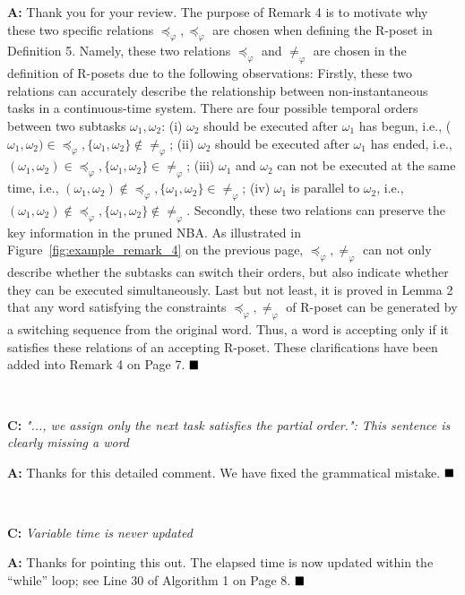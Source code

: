 \documentclass[10pt]{article}
\begin{document}
\textbf{A:} Thank you for your review.
The purpose of Remark 4 is to motivate why these two specific relations $\preceq_\varphi, \preceq_\varphi$ are chosen
when defining the R-poset in Definition 5.
Namely, these two relations $\preceq_\varphi$ and $\neq_\varphi$
are chosen in the definition of R-posets due to the following observations:
Firstly, these two relations can accurately describe the relationship
between non-instantaneous tasks in a continuous-time system.
There are four possible temporal orders between two subtasks $\omega_1,\omega_2$:
(i) $\omega_2$ should be executed after $\omega_1$ has begun, i.e., ($\omega_1,\omega_2)\in\preceq_{\varphi},\{\omega_1,\omega_2\}\notin\neq_\varphi$;
(ii) $\omega_2$ should be executed after $\omega_1$ has ended, i.e.,
$(\omega_1,\omega_2)\in\preceq_{\varphi}, \{\omega_1,\omega_2\}\in\neq_\varphi$;
(iii) $\omega_1$ and $\omega_2$ can not be executed at the same time,
i.e., $(\omega_1,\omega_2)\notin\preceq_\varphi,\{\omega_1,\omega_2\}\in\neq_\varphi$;
(iv) $\omega_1$ is parallel to $\omega_2$, i.e., $(\omega_1,\omega_2)\notin\preceq_\varphi,
\{\omega_1,\omega_2\}\notin\neq_\varphi$.
Secondly, these two relations can preserve the key information in the
pruned NBA.
As illustrated in Figure~\ref{fig:example_remark_4} on the previous page, %
$\preceq_\varphi,\neq_\varphi$ can not only
describe whether the subtasks can switch their orders,
but also indicate whether they can be executed simultaneously.
Last but not least, it is proved in Lemma 2 that any word satisfying
the constraints $\preceq_\varphi, \neq_\varphi$ of R-poset can be
generated by a switching sequence from the original word.
Thus, a word is accepting only if it satisfies these relations of an accepting R-poset.
These clarifications have been added into Remark 4 on Page 7.
$\hfill\blacksquare$

\hspace*{\fill} \


\textbf{C:}
\emph{ "..., we assign only the next task satisfies the partial order.": This sentence is clearly missing a
	word
}

\textbf{A:} Thanks for this detailed comment. We have fixed the grammatical mistake.
$\hfill\blacksquare$

\hspace*{\fill} \

\textbf{C:}
\emph{Variable time is never updated
}

\textbf{A:} Thanks for pointing this out. The elapsed time is now updated within the ``while'' loop; see Line $30$ of Algorithm 1 on Page 8.
$\hfill\blacksquare$
\end{document}
